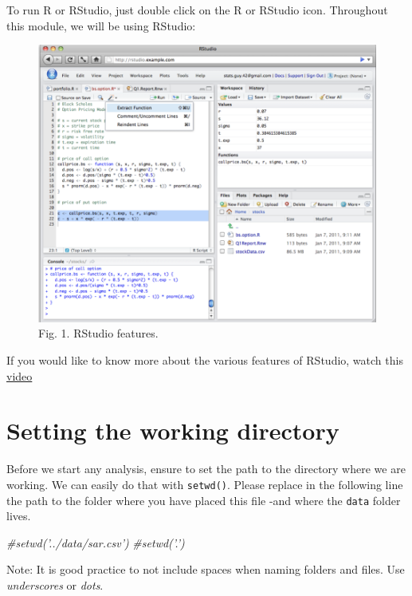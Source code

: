 \documentclass[
]{book}
\newenvironment{Shaded}{\begin{snugshade}}{\end{snugshade}}
\newcommand{\CommentTok}[1]{\textcolor[rgb]{0.56,0.35,0.01}{\textit{#1}}}
\begin{document}
To run R or RStudio, just double click on the R or RStudio icon. Throughout this module, we will be using RStudio:

\begin{figure}
\centering
\includegraphics{figs/ch2/rstudio_features.png}
\caption{Fig. 1. RStudio features.}
\end{figure}

If you would like to know more about the various features of RStudio, watch this \href{https://rstudio.com/products/rstudio/}{video}

\hypertarget{setting-the-working-directory}{%
\section{Setting the working directory}\label{setting-the-working-directory}}

Before we start any analysis, ensure to set the path to the directory where we are working. We can easily do that with \texttt{setwd()}. Please replace in the following line the path to the folder where you have placed this file -and where the \texttt{data} folder lives.

\begin{Shaded}
\begin{Highlighting}[]
\CommentTok{#setwd('../data/sar.csv')}
\CommentTok{#setwd('.')}
\end{Highlighting}
\end{Shaded}

Note: It is good practice to not include spaces when naming folders and files. Use \emph{underscores} or \emph{dots}.
\end{document}

